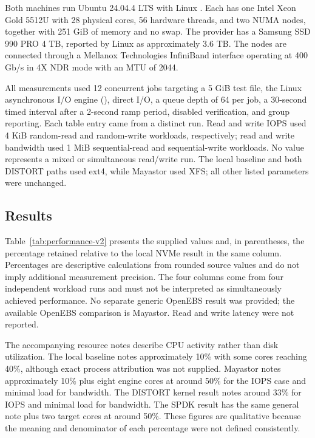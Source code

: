 \documentclass[10pt,a4paper,twocolumn]{article}
\newcommand{\distort}{DISTORT}
\newcommand{\code}[1]{\texttt{\detokenize{#1}}}
\begin{document}
Both machines run Ubuntu 24.04.4 LTS with Linux
\code{6.8.0-124-generic}. Each has one Intel Xeon Gold 5512U with 28 physical
cores, 56 hardware threads, and two NUMA nodes, together with 251 GiB of memory
and no swap. The provider has a Samsung SSD 990 PRO 4 TB, reported by Linux as
approximately 3.6 TB. The nodes are connected through a Mellanox Technologies
InfiniBand interface operating at 400 Gb/s in 4X NDR mode with an MTU of 2044.

All measurements used 12 concurrent \code{fio} jobs targeting a 5 GiB test
file, the Linux asynchronous I/O engine (\code{libaio}), direct I/O, a queue
depth of 64 per job, a 30-second timed interval after a 2-second ramp period,
disabled verification, and group reporting. Each table entry came from a
distinct run. Read and write IOPS used 4 KiB random-read and random-write
workloads, respectively; read and write bandwidth used 1 MiB sequential-read
and sequential-write workloads. No value represents a mixed or simultaneous
read/write run. The local baseline and both \distort{} paths used ext4, while
Mayastor used XFS; all other listed \code{fio} parameters were unchanged.

\subsection{Results}

Table~\ref{tab:performance-v2} presents the supplied values and, in
parentheses, the percentage retained relative to the local NVMe result in the
same column. Percentages are descriptive calculations from rounded source
values and do not imply additional measurement precision. The four columns
come from four independent workload runs and must not be interpreted as
simultaneously achieved performance. No separate generic OpenEBS result was
provided; the available OpenEBS comparison is Mayastor. Read and write latency
were not reported.

The accompanying resource notes describe CPU activity rather than disk
utilization. The local baseline notes approximately 10\% with some cores
reaching 40\%, although exact process attribution was not supplied. Mayastor
notes approximately 10\% plus eight engine cores at around 50\% for the IOPS
case and minimal load for bandwidth. The \distort{} kernel result notes around
33\% for IOPS and minimal load for bandwidth. The SPDK result has the same
general note plus two target cores at around 50\%. These figures are
qualitative because the meaning and denominator of each percentage were not
defined consistently.
\end{document}
